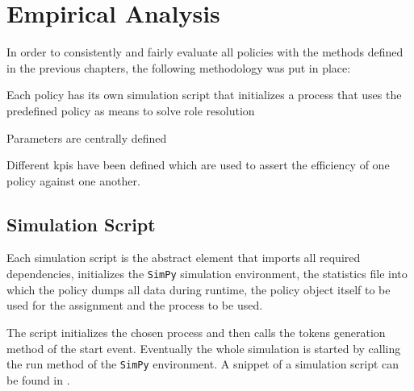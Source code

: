 \chapter{Empirical Analysis}
\label{ch:empirical_analysis}

In order to consistently and fairly evaluate all policies with the methods defined in the previous chapters, the following methodology was put in place:
\begin{enumerate*}
	\item Each policy has its own simulation script that initializes a process that uses the predefined policy as means to solve role resolution
	\item Parameters are centrally defined
	\item Different \glspl{kpi} have been defined which are used to assert the efficiency of one policy against one another.
\end{enumerate*}

\section{Simulation Script}

Each simulation script is the abstract element that imports all required dependencies, initializes the \texttt{SimPy} simulation environment, the statistics file into which the policy dumps all data during runtime, the policy object itself to be used for the assignment and the process to be used. 

The script initializes the chosen process and then calls the tokens generation method of the start event. Eventually the whole simulation is started by calling the run method of the \texttt{SimPy} environment. A snippet of a simulation script can be found in .

